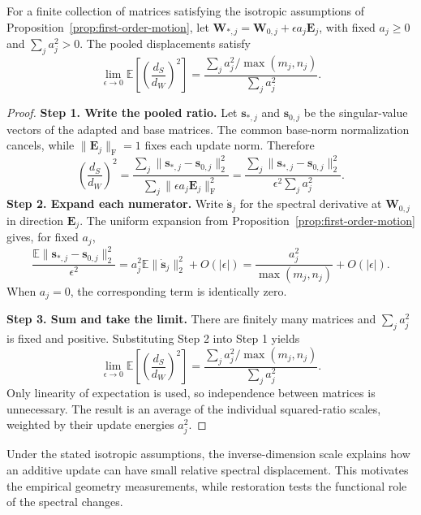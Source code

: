 \begin{corollary}\label{cor:pooled-spectral-scale}
For a finite collection of matrices satisfying the isotropic assumptions of Proposition~\ref{prop:first-order-motion}, let $\bm W_{*,j}=\bm W_{0,j}+\epsilon a_j\bm E_j$, with fixed $a_j\geq0$ and $\sum_j a_j^2>0$. The pooled displacements satisfy
\begin{equation*}
\lim_{\epsilon\to0}\mathbb E\left[\left(\frac{d_S}{d_W}\right)^2\right]
=\frac{\sum_j a_j^2/\max(m_j,n_j)}{\sum_j a_j^2}.
\end{equation*}
\end{corollary}
\begin{proof}
\textbf{Step 1. Write the pooled ratio.} Let $\bm s_{*,j}$ and $\bm s_{0,j}$ be the singular-value vectors of the adapted and base matrices. The common base-norm normalization cancels, while $\|\bm E_j\|_{\mathrm F}=1$ fixes each update norm. Therefore
\begin{equation*}
\left(\frac{d_S}{d_W}\right)^2
=\frac{\sum_j\|\bm s_{*,j}-\bm s_{0,j}\|_2^2}{\sum_j\|\epsilon a_j\bm E_j\|_{\mathrm F}^2}
=\frac{\sum_j\|\bm s_{*,j}-\bm s_{0,j}\|_2^2}{\epsilon^2\sum_j a_j^2}.
\end{equation*}
\textbf{Step 2. Expand each numerator.} Write $\dot{\bm s}_j$ for the spectral derivative at $\bm W_{0,j}$ in direction $\bm E_j$. The uniform expansion from Proposition~\ref{prop:first-order-motion} gives, for fixed $a_j$,
\begin{equation*}
\frac{\mathbb E\|\bm s_{*,j}-\bm s_{0,j}\|_2^2}{\epsilon^2}
=a_j^2\mathbb E\|\dot{\bm s}_j\|_2^2+O(|\epsilon|)
=\frac{a_j^2}{\max(m_j,n_j)}+O(|\epsilon|).
\end{equation*}
When $a_j=0$, the corresponding term is identically zero.

\textbf{Step 3. Sum and take the limit.} There are finitely many matrices and $\sum_j a_j^2$ is fixed and positive. Substituting Step 2 into Step 1 yields
\begin{equation*}
\lim_{\epsilon\to0}\mathbb E\left[\left(\frac{d_S}{d_W}\right)^2\right]
=\frac{\sum_j a_j^2/\max(m_j,n_j)}{\sum_j a_j^2}.
\end{equation*}
Only linearity of expectation is used, so independence between matrices is unnecessary. The result is an average of the individual squared-ratio scales, weighted by their update energies $a_j^2$.
\end{proof}

Under the stated isotropic assumptions, the inverse-dimension scale explains how an additive update can have small relative spectral displacement. This motivates the empirical geometry measurements, while restoration tests the functional role of the spectral changes. 
